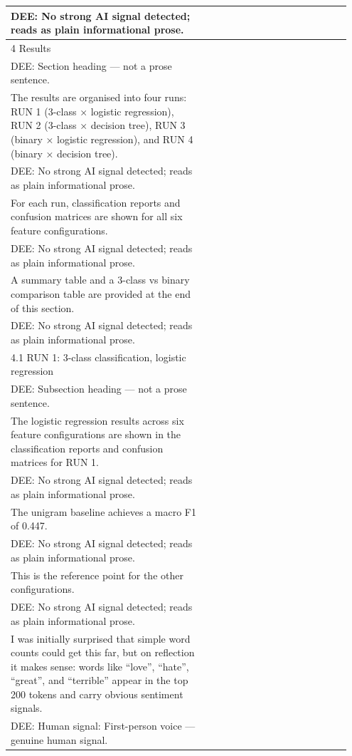 \documentclass[11pt]{article}
\begin{document}
\begin{longtable}{|p{0.55\linewidth}|p{0.40\linewidth}|}
\hline
DEE: No strong AI signal detected; reads as plain informational prose. & \\
\hline
4 Results & \\[2pt]
\hline
DEE: Section heading --- not a prose sentence. & \\
\hline
The results are organised into four runs: RUN 1 (3-class × logistic regression), RUN 2 (3-class × decision tree), RUN 3 (binary × logistic regression), and RUN 4 (binary × decision tree). & \\[2pt]
\hline
DEE: No strong AI signal detected; reads as plain informational prose. & \\
\hline
For each run, classification reports and confusion matrices are shown for all six feature configurations. & \\[2pt]
\hline
DEE: No strong AI signal detected; reads as plain informational prose. & \\
\hline
A summary table and a 3-class vs binary comparison table are provided at the end of this section. & \\[2pt]
\hline
DEE: No strong AI signal detected; reads as plain informational prose. & \\
\hline
4.1 RUN 1: 3-class classification, logistic regression & \\[2pt]
\hline
DEE: Subsection heading --- not a prose sentence. & \\
\hline
The logistic regression results across six feature configurations are shown in the classification reports and confusion matrices for RUN 1. & \\[2pt]
\hline
DEE: No strong AI signal detected; reads as plain informational prose. & \\
\hline
The unigram baseline achieves a macro F1 of 0.447. & \\[2pt]
\hline
DEE: No strong AI signal detected; reads as plain informational prose. & \\
\hline
This is the reference point for the other configurations. & \\[2pt]
\hline
DEE: No strong AI signal detected; reads as plain informational prose. & \\
\hline
I was initially surprised that simple word counts could get this far, but on reflection it makes sense: words like ``love'', ``hate'', ``great'', and ``terrible'' appear in the top 200 tokens and carry obvious sentiment signals. & \\[2pt]
\hline
DEE: Human signal: First-person voice --- genuine human signal. & \\

\end{longtable}
\end{document}
